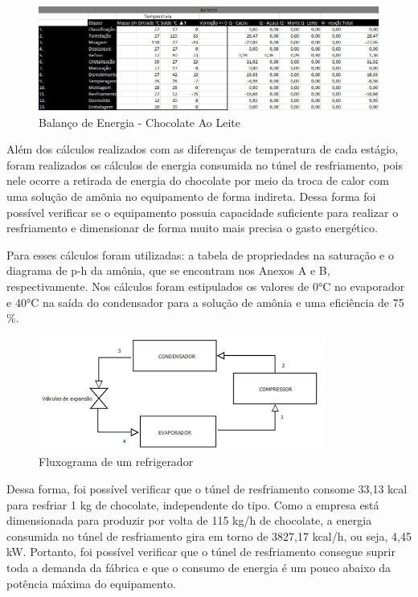 \documentclass[
	12pt,				%
	openright,			%
	oneside,			%
	a4paper,			%
	english,			%
	french,				%
	spanish,			%
	brazil				%
	]{abntex2}
\begin{document}
\begin{figure}[H]
\begin{center}
\caption{Balanço de Energia - Chocolate Ao Leite}
\includegraphics[scale=0.5]{../../Pictures/ao leite.jpg} 
\end{center}
\end{figure}


Além dos cálculos realizados com as diferenças de temperatura de cada estágio, foram realizados os cálculos de energia consumida no túnel de resfriamento, pois nele ocorre a retirada de energia do chocolate por meio da troca de calor com uma solução de amõnia no equipamento de forma indireta. Dessa forma foi possível verificar se o equipamento possuia capacidade suficiente para realizar o resfriamento e dimensionar de forma muito mais precisa o gasto energético.

Para esses cálculos foram utilizadas: a tabela de propriedades na saturação e o diagrama de p-h da amônia, que se encontram nos Anexos A e B, respectivamente. Nos cálculos foram estipulados os valores de 0°C no evaporador e 40°C na saída do condensador para a solução de amônia e uma eficiência de 75$\%$.

\begin{figure}[H]
\begin{center}
\caption{Fluxograma de um refrigerador}
\includegraphics[scale=1]{../../Pictures/esquema.png} 
\end{center}
\end{figure}

Dessa forma, foi possível verificar que o túnel de resfriamento consome 33,13 kcal para resfriar 1 kg de chocolate, independente do tipo. Como a empresa está dimensionada para produzir por volta de 115 kg/h de chocolate, a energia consumida no túnel de resfriamento gira em torno de 3827,17 kcal/h, ou seja, 4,45 kW. Portanto, foi possível verificar que o túnel de resfriamento consegue suprir toda a demanda da fábrica e que o consumo de energia é um pouco abaixo da potência máxima do equipamento.
\end{document}
